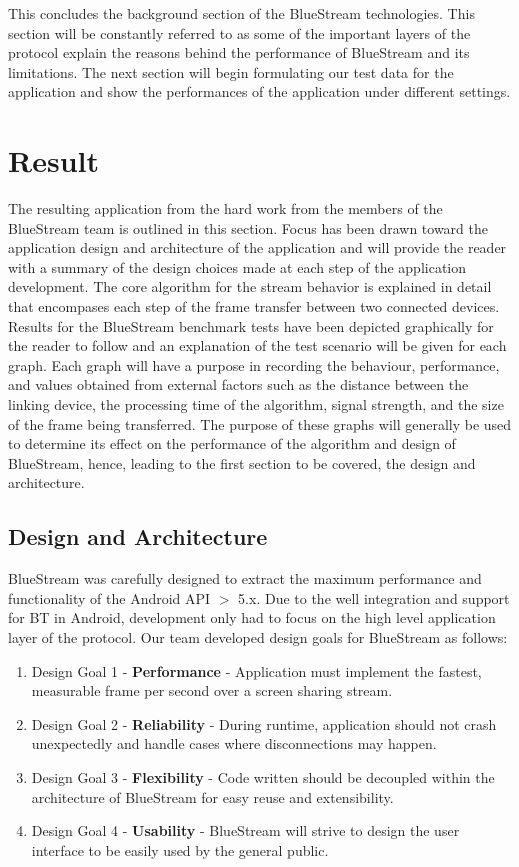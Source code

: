\documentclass[a4paper,12pt]{article}
\begin{document}
This concludes the background section of the BlueStream technologies. This section will be constantly referred to as some of the important layers of the protocol explain the reasons behind the performance of BlueStream and its limitations. The next section will begin formulating our test data for the application and show the performances of the application under different settings.

\section{Result}
The resulting application from the hard work from the members of the BlueStream team is outlined in this section. Focus has been drawn toward the application design and architecture of the application and will provide the reader with a summary of the design choices made at each step of the application development. The core algorithm for the stream behavior is explained in detail that encompases each step of the frame transfer between two connected devices. Results for the BlueStream benchmark tests have been depicted graphically for the reader to follow and an explanation of the test scenario will be given for each graph. Each graph will have a purpose in recording the behaviour, performance, and values obtained from external factors such as the distance between the linking device, the processing time of the algorithm, signal strength, and the size of the frame being transferred. The purpose of these graphs will generally be used to determine its effect on the performance of the algorithm and design of BlueStream, hence, leading to the first section to be covered, the design and architecture.

\subsection{Design and Architecture}
BlueStream was carefully designed to extract the maximum performance and functionality of the Android API $>$ 5.x. Due to the well integration and support for BT in Android, development only had to focus on the high level application layer of the protocol. Our team developed design goals for BlueStream as follows:

\begin{enumerate}
\item Design Goal 1 - \textbf{Performance} - Application must implement the fastest, measurable frame per second over a screen sharing stream. 
\item Design Goal 2 - \textbf{Reliability} - During runtime, application should not crash unexpectedly and handle cases where disconnections may happen. 
\item Design Goal 3 - \textbf{Flexibility} - Code written should be decoupled within the architecture of BlueStream for easy reuse and extensibility.
\item Design Goal 4 - \textbf{Usability} -  BlueStream will strive to design the user interface to be easily used by the general public.
\end{enumerate}
\end{document}
